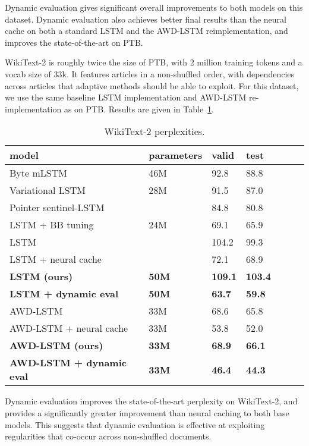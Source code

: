 \documentclass{article} \usepackage{iclr2018_conference,times}
\begin{document}
Dynamic evaluation gives significant overall improvements to both models on this dataset. Dynamic evaluation also achieves better final results than the neural cache on both a standard LSTM and the AWD-LSTM reimplementation, and improves the state-of-the-art on PTB\@. 

WikiText-2 is roughly twice the size of PTB, with 2 million training tokens and a vocab size of 33k. It features articles in a non-shuffled order, with dependencies across articles that adaptive methods should be able to exploit. For this dataset, we use the same baseline LSTM implementation and AWD-LSTM re-implementation as on PTB\@. Results are given in Table~\ref{tab:wikitext}.

\begin{table}[tb]
\begin{center} 
\begin{tabular}{  l  l  l  l  l  l  l } \toprule 
model &  parameters & valid & test  \\ 
\midrule 
Byte mLSTM \citep{krause2016} & 46M &92.8 & 88.8 \\
Variational LSTM \citep{inan2017} & 28M &91.5 & 87.0 \\
Pointer sentinel-LSTM \citep{Merity2016} & & 84.8 & 80.8 \\
LSTM + BB tuning \citep{melis2017}& 24M & 69.1 & 65.9 \\
\midrule 
LSTM   \citep{grave2017} & & 104.2 & 99.3 \\
LSTM + neural cache \citep{grave2017}& & 72.1 & 68.9 \\
\textbf{LSTM (ours)} &\textbf{50M} & \textbf{109.1} & \textbf{103.4}  \\
\textbf{LSTM + dynamic eval}&\textbf{50M}  &  \textbf{63.7} & \textbf{59.8}\\
\midrule 
AWD-LSTM  \citep{merity2017}& 33M  & 68.6 & 65.8 \\
AWD-LSTM  + neural cache \citep{merity2017}& 33M & 53.8 & 52.0 \\
\textbf{AWD-LSTM (ours)}& \textbf{33M} & \textbf{68.9} &  \textbf{66.1} \\
\textbf{AWD-LSTM + dynamic eval}& \textbf{33M}  & \textbf{46.4} & \textbf{44.3} \\
\bottomrule
\end{tabular} 
\end{center}
\caption{WikiText-2 perplexities.}
\label{tab:wikitext}
\end{table}

Dynamic evaluation improves the state-of-the-art perplexity on WikiText-2, and provides a significantly greater improvement than neural caching to both base models. This suggests that dynamic evaluation is effective at exploiting regularities that co-occur across non-shuffled documents.
\end{document}
